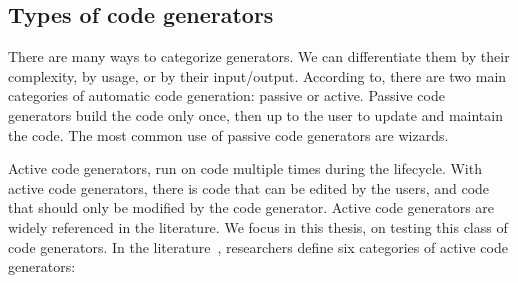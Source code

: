 \subsection{Types of code generators}
\label{bg:Types of code generators}
There are many ways to categorize generators. We can differentiate them by their complexity, by usage, or by their input/output. According to\cite{herrington2003code}, there are two main categories of automatic code generation: passive or active. Passive code generators build the code only once, then  up to the user to update and maintain the code. 
The most common use of passive code generators are wizards. 

Active code generators, run on code multiple times during the lifecycle. With active code generators, there is code that can be edited by the users, and code that should only be modified by the code generator. Active code generators are widely referenced in the literature\cite{pais2005tool,amanquah2009rapid}. We focus in this thesis, on testing this class of code generators.
In the literature~\cite{herrington2003code,hunt2000pragmatic,fertalj2008source,bajovs2013code}, researchers define six categories of active code generators: 

